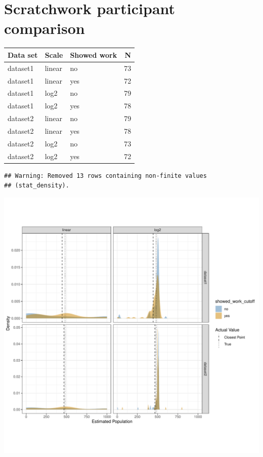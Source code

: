 \documentclass[print]{nuthesis}
\begin{document}
\hypertarget{estimation-comparison}{%
\section{Scratchwork participant comparison}\label{estimation-comparison}}

\begin{tabular}{l|l|l|r}
\hline
Data set & Scale & Showed work & N\\
\hline
dataset1 & linear & no & 73\\
\hline
dataset1 & linear & yes & 72\\
\hline
dataset1 & log2 & no & 79\\
\hline
dataset1 & log2 & yes & 78\\
\hline
dataset2 & linear & no & 79\\
\hline
dataset2 & linear & yes & 78\\
\hline
dataset2 & log2 & no & 73\\
\hline
dataset2 & log2 & yes & 72\\
\hline
\end{tabular}

\begin{verbatim}
## Warning: Removed 13 rows containing non-finite values
## (stat_density).
\end{verbatim}

\begin{center}\includegraphics[width=\linewidth,]{thesis_files/figure-latex/unnamed-chunk-2-1} \end{center}
\end{document}
